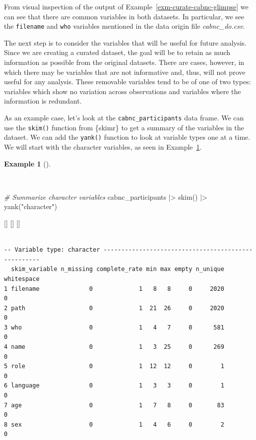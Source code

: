 \documentclass[
  letterpaper,
  krantz1]{latex/krantz-mod}
\newenvironment{Shaded}{\begin{snugshade}}{\end{snugshade}}
\newcommand{\CommentTok}[1]{\textcolor[rgb]{0.00,0.00,0.00}{\textit{#1}}}
\newcommand{\FunctionTok}[1]{\textcolor[rgb]{0.00,0.00,0.00}{#1}}
\newcommand{\NormalTok}[1]{\textcolor[rgb]{0.00,0.00,0.00}{#1}}
\newcommand{\SpecialCharTok}[1]{\textcolor[rgb]{0.00,0.00,0.00}{#1}}
\newcommand{\StringTok}[1]{\textcolor[rgb]{0.00,0.00,0.00}{#1}}
\newcommand{\cindex}[1]{%
  \StrSubstitute{#1}{_}{\_}[\temp]%
  \index{\temp}%
}
\theoremstyle{definition}
\theoremstyle{definition}
\newtheorem{example}{Example}[chapter]
\theoremstyle{remark}
\begin{document}
From visual inspection of the output of
Example~\ref{exm-curate-cabnc-glimpse} we can see that there are common
variables in both datasets. In particular, we see the \texttt{filename}
and \texttt{who} variables mentioned in the data origin file
\emph{cabnc\_do.csv}.

The next step is to consider the variables that will be useful for
future analysis. Since we are creating a curated dataset, the goal will
be to retain as much information as possible from the original datasets.
There are cases, however, in which there may be variables that are not
informative and, thus, will not prove useful for any analysis. These
removable variables tend to be of one of two types: variables which show
no variation across observations and variables where the information is
redundant.

As an example case, let's look at the \texttt{cabnc\_participants} data
frame. We can use the \texttt{skim()} function from \{skimr\} to get a
summary of the variables in the dataset. We can add the \texttt{yank()}
function to look at variable types one at a time. We will start with the
character variables, as seen in
Example~\ref{exm-curate-cabnc-skim-character}.

\begin{example}[]\protect\hypertarget{exm-curate-cabnc-skim-character}{}\label{exm-curate-cabnc-skim-character}

~

\begin{Shaded}
\begin{Highlighting}[numbers=left,,]
\CommentTok{\# Summarize character variables}
\NormalTok{cabnc\_participants }\SpecialCharTok{|\textgreater{}}
  \FunctionTok{skim}\NormalTok{() }\SpecialCharTok{|\textgreater{}}
  \FunctionTok{yank}\NormalTok{(}\StringTok{"character"}\NormalTok{)}
\end{Highlighting}
\end{Shaded}

\cindex{library()}\cindex{skim()}\cindex{yank()}

\begin{verbatim}

-- Variable type: character ----------------------------------------------------
  skim_variable n_missing complete_rate min max empty n_unique whitespace
1 filename              0             1   8   8     0     2020          0
2 path                  0             1  21  26     0     2020          0
3 who                   0             1   4   7     0      581          0
4 name                  0             1   3  25     0      269          0
5 role                  0             1  12  12     0        1          0
6 language              0             1   3   3     0        1          0
7 age                   0             1   7   8     0       83          0
8 sex                   0             1   4   6     0        2          0
\end{verbatim}

\end{example}
\end{document}
